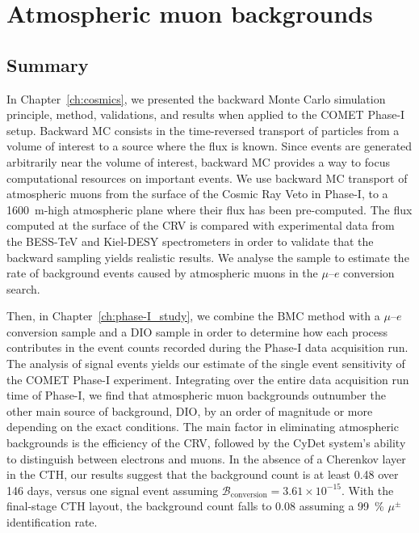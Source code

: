 



\section{Atmospheric muon backgrounds}

\subsection{Summary}
In Chapter~\ref{ch:cosmics}, we presented the backward Monte Carlo simulation
principle, method, validations, and results when applied to the COMET Phase-I
setup. Backward MC consists in the time-reversed transport of particles from a
volume of interest to a source where the flux is known. Since events are
generated arbitrarily near the volume of interest, backward MC provides a way to
focus computational resources on important events. We use backward MC transport
of atmospheric muons from the surface of the Cosmic Ray Veto in Phase-I, to a
\SI{1600}{\metre}-high atmospheric plane where their flux has been pre-computed.
The flux computed at the surface of the CRV is compared with experimental data
from the BESS-TeV and Kiel-DESY spectrometers in order to validate that the
backward sampling yields realistic results. We analyse the sample to estimate
the rate of background events caused by atmospheric muons in the $\mu$--$e$
conversion search.

Then, in Chapter~\ref{ch:phase-I_study}, we combine the BMC method with a
$\mu$--$e$ conversion sample and a DIO sample in order to determine how each
process contributes in the event counts recorded during the Phase-I data
acquisition run. The analysis of signal events yields our estimate of the single
event sensitivity of the COMET Phase-I experiment. Integrating over the entire
data acquisition run time of Phase-I, we find that atmospheric muon backgrounds
outnumber the other main source of background, DIO, by an order of magnitude or
more depending on the exact conditions. The main factor in eliminating
atmospheric backgrounds is the efficiency of the CRV, followed by the CyDet
system's ability to distinguish between electrons and muons. In the absence of a
Cherenkov layer in the CTH, our results suggest that the background count is at
least 0.48 over 146 days, versus one signal event assuming
$\mathcal{B}_\mathrm{conversion} = 3.61 \times 10^{-15}$. With the final-stage
CTH layout, the background count falls to 0.08 assuming a \SI{99}{\percent}
$\mu^\pm$ identification rate.

